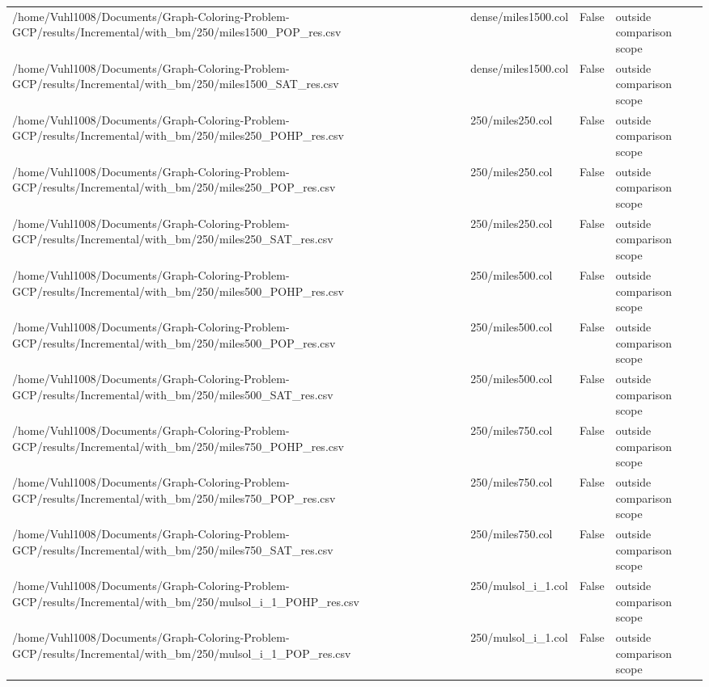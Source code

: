 \begin{table}[htbp]
\begin{tabular}{llll}
/home/Vuhl1008/Documents/Graph-Coloring-Problem-GCP/results/Incremental/with\_bm/250/miles1500\_POP\_res.csv & dense/miles1500.col & False & outside comparison scope \\
/home/Vuhl1008/Documents/Graph-Coloring-Problem-GCP/results/Incremental/with\_bm/250/miles1500\_SAT\_res.csv & dense/miles1500.col & False & outside comparison scope \\
/home/Vuhl1008/Documents/Graph-Coloring-Problem-GCP/results/Incremental/with\_bm/250/miles250\_POHP\_res.csv & 250/miles250.col & False & outside comparison scope \\
/home/Vuhl1008/Documents/Graph-Coloring-Problem-GCP/results/Incremental/with\_bm/250/miles250\_POP\_res.csv & 250/miles250.col & False & outside comparison scope \\
/home/Vuhl1008/Documents/Graph-Coloring-Problem-GCP/results/Incremental/with\_bm/250/miles250\_SAT\_res.csv & 250/miles250.col & False & outside comparison scope \\
/home/Vuhl1008/Documents/Graph-Coloring-Problem-GCP/results/Incremental/with\_bm/250/miles500\_POHP\_res.csv & 250/miles500.col & False & outside comparison scope \\
/home/Vuhl1008/Documents/Graph-Coloring-Problem-GCP/results/Incremental/with\_bm/250/miles500\_POP\_res.csv & 250/miles500.col & False & outside comparison scope \\
/home/Vuhl1008/Documents/Graph-Coloring-Problem-GCP/results/Incremental/with\_bm/250/miles500\_SAT\_res.csv & 250/miles500.col & False & outside comparison scope \\
/home/Vuhl1008/Documents/Graph-Coloring-Problem-GCP/results/Incremental/with\_bm/250/miles750\_POHP\_res.csv & 250/miles750.col & False & outside comparison scope \\
/home/Vuhl1008/Documents/Graph-Coloring-Problem-GCP/results/Incremental/with\_bm/250/miles750\_POP\_res.csv & 250/miles750.col & False & outside comparison scope \\
/home/Vuhl1008/Documents/Graph-Coloring-Problem-GCP/results/Incremental/with\_bm/250/miles750\_SAT\_res.csv & 250/miles750.col & False & outside comparison scope \\
/home/Vuhl1008/Documents/Graph-Coloring-Problem-GCP/results/Incremental/with\_bm/250/mulsol\_i\_1\_POHP\_res.csv & 250/mulsol\_i\_1.col & False & outside comparison scope \\
/home/Vuhl1008/Documents/Graph-Coloring-Problem-GCP/results/Incremental/with\_bm/250/mulsol\_i\_1\_POP\_res.csv & 250/mulsol\_i\_1.col & False & outside comparison scope \\

\end{tabular}
\end{table}

